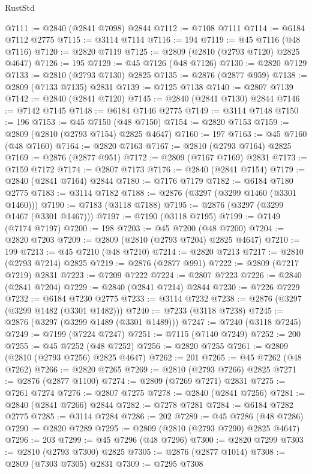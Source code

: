 \begin{lexlean}{RustStd}
\begin{coremodule}
{\begin{coremodule}
{{{{{{{{{{{{{{{{{{{{{{{{{{{{{{{{{@7111 := @2840 (@2841 @7098) @2844
@7112 := @7108 @7111
@7114 := @6184 @7112 @2775
@7115 := @3114 @7114
@7116 := 194
@7119 := @45 @7116 (@48 @7116)
@7120 := @2820 @7119
@7125 := @2809 (@2810 (@2793 @7120) @2825 @4647)
@7126 := 195
@7129 := @45 @7126 (@48 @7126)
@7130 := @2820 @7129
@7133 := @2810 (@2793 @7130) @2825
@7135 := @2876 (@2877 @959)
@7138 := @2809 (@7133 @7135) @2831
@7139 := @7125 @7138
@7140 := @2807 @7139
@7142 := @2840 (@2841 @7120)
@7145 := @2840 (@2841 @7130) @2844
@7146 := @7142 @7145
@7148 := @6184 @7146 @2775
@7149 := @3114 @7148
@7150 := 196
@7153 := @45 @7150 (@48 @7150)
@7154 := @2820 @7153
@7159 := @2809 (@2810 (@2793 @7154) @2825 @4647)
@7160 := 197
@7163 := @45 @7160 (@48 @7160)
@7164 := @2820 @7163
@7167 := @2810 (@2793 @7164) @2825
@7169 := @2876 (@2877 @951)
@7172 := @2809 (@7167 @7169) @2831
@7173 := @7159 @7172
@7174 := @2807 @7173
@7176 := @2840 (@2841 @7154)
@7179 := @2840 (@2841 @7164) @2844
@7180 := @7176 @7179
@7182 := @6184 @7180 @2775
@7183 := @3114 @7182
@7188 := @2876 (@3297 (@3299 @1460 (@3301 @1460)))
@7190 := @7183 (@3118 @7188)
@7195 := @2876 (@3297 (@3299 @1467 (@3301 @1467)))
@7197 := @7190 (@3118 @7195)
@7199 := @7149 (@7174 @7197)
@7200 := 198
@7203 := @45 @7200 (@48 @7200)
@7204 := @2820 @7203
@7209 := @2809 (@2810 (@2793 @7204) @2825 @4647)
@7210 := 199
@7213 := @45 @7210 (@48 @7210)
@7214 := @2820 @7213
@7217 := @2810 (@2793 @7214) @2825
@7219 := @2876 (@2877 @991)
@7222 := @2809 (@7217 @7219) @2831
@7223 := @7209 @7222
@7224 := @2807 @7223
@7226 := @2840 (@2841 @7204)
@7229 := @2840 (@2841 @7214) @2844
@7230 := @7226 @7229
@7232 := @6184 @7230 @2775
@7233 := @3114 @7232
@7238 := @2876 (@3297 (@3299 @1482 (@3301 @1482)))
@7240 := @7233 (@3118 @7238)
@7245 := @2876 (@3297 (@3299 @1489 (@3301 @1489)))
@7247 := @7240 (@3118 @7245)
@7249 := @7199 (@7224 @7247)
@7251 := @7115 (@7140 @7249)
@7252 := 200
@7255 := @45 @7252 (@48 @7252)
@7256 := @2820 @7255
@7261 := @2809 (@2810 (@2793 @7256) @2825 @4647)
@7262 := 201
@7265 := @45 @7262 (@48 @7262)
@7266 := @2820 @7265
@7269 := @2810 (@2793 @7266) @2825
@7271 := @2876 (@2877 @1100)
@7274 := @2809 (@7269 @7271) @2831
@7275 := @7261 @7274
@7276 := @2807 @7275
@7278 := @2840 (@2841 @7256)
@7281 := @2840 (@2841 @7266) @2844
@7282 := @7278 @7281
@7284 := @6184 @7282 @2775
@7285 := @3114 @7284
@7286 := 202
@7289 := @45 @7286 (@48 @7286)
@7290 := @2820 @7289
@7295 := @2809 (@2810 (@2793 @7290) @2825 @4647)
@7296 := 203
@7299 := @45 @7296 (@48 @7296)
@7300 := @2820 @7299
@7303 := @2810 (@2793 @7300) @2825
@7305 := @2876 (@2877 @1014)
@7308 := @2809 (@7303 @7305) @2831
@7309 := @7295 @7308
}}}}}}}}}}}}}}}}}}}}}}}}}}}}}}}}}
\end{coremodule}}
\end{coremodule}
\end{lexlean}
